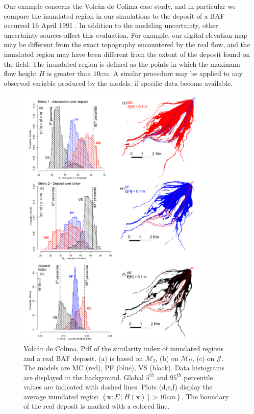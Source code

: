 \documentclass{article}
\begin{document}
Our example concerns the Volc{\'a}n de Colima case study, and in particular we compare the inundated region in our simulations to the deposit of a BAF occurred 16 April 1991 \citep{Saucedo2004, Rupp2004, Rupp2006}. In addition to the modeling uncertainty, other uncertainty sources affect this evaluation. For example, our digital elevation map may be different from the exact topography encountered by the real flow, and the inundated region may have been different from the extent of the deposit found on the field. The inundated region is defined as the points in which the maximum flow height $H$ is greater than $10 cm$. A similar procedure may be applied to any observed variable produced by the models, if specific data become available.
\begin{figure}[H]
         \centering
        \includegraphics[width=0.85\textwidth]{Histograms.jpg}
        \caption{Volc{\'a}n de Colima. Pdf of the similarity index of inundated regions and a real BAF deposit. (a) is based on $\mathcal M_I$, (b) on $\mathcal M_U$, (c) on $\mathcal J$. The models are MC (red), PF (blue), VS (black). Data histograms are displayed in the background. Global $5^{th}$ and $95^{th}$ percentile values are indicated with dashed lines. Plots (d,e,f) display the average inundated region $\left\{\textbf{x} : E[H(\textbf{x})]>10 cm\right\}$. The boundary of the real deposit is marked with a colored line.}\label{fig:Colima-Hist}
\end{figure}
\end{document}
